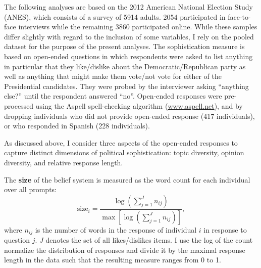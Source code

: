 \documentclass[12pt]{article}
\begin{document}
The following analyses are based on the 2012 American National Election Study (ANES), which consists of a survey of 5914 adults. 2054 participated in face-to-face interviews while the remaining 3860 participated online. While these samples differ slightly with regard to the inclusion of some variables, I rely on the pooled dataset for the purpose of the present analyses. The sophistication measure is based on open-ended questions in which respondents were asked to list anything in particular that they like/dislike about the Democratic/Republican party as well as anything that might make them vote/not vote for either of the Presidential candidates. They were probed by the interviewer asking ``anything else?'' until the respondent answered ``no''. Open-ended responses were pre-processed using the Aspell spell-checking algorithm (\url{www.aspell.net}), and by dropping individuals who did not provide open-ended response (417 individuals), or who responded in Spanish (228 individuals). 

As discussed above, I consider three aspects of the open-ended responses to capture distinct dimensions of political sophistication: topic diversity, opinion diversity, and relative response length. 

The \textbf{size} of the belief system is measured as the word count for each individual over all prompts:
\begin{equation}
\text{size}_i = \dfrac{\log\left(\sum_{j=1}^J n_{ij}\right)}{\max\left[\log\left(\sum_{j=1}^J n_{ij}\right)\right]},
\end{equation}
where $n_{ij}$ is the number of words in the response of individual $i$ in response to question $j$. $J$ denotes the set of all likes/dislikes items. I use the log of the count normalize the distribution of responses and divide it by the maximal response length in the data such that the resulting measure ranges from 0 to 1.
\end{document}

